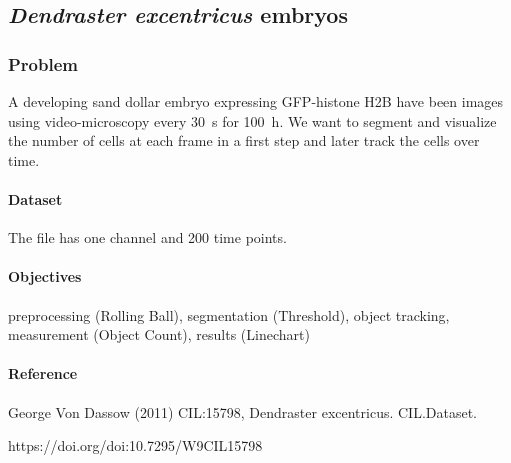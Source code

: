 \subsection{\textit{Dendraster excentricus} embryos}

\subsubsection*{Problem}
A developing sand dollar embryo expressing GFP-histone H2B have been images using video-microscopy every \SI{30}{\second} for \SI{100}{\hour}. We want to segment and visualize the number of cells at each frame in a first step and later track the cells over time.

\paragraph{Dataset} The file  has one channel and 200 time points.

\paragraph{Objectives} 
preprocessing (Rolling Ball), 
segmentation (Threshold), 
object tracking, 
measurement (Object Count), 
results (Linechart)

\paragraph{Reference} 
George Von Dassow (2011) CIL:15798, Dendraster excentricus. CIL.Dataset. 

https://doi.org/doi:10.7295/W9CIL15798



